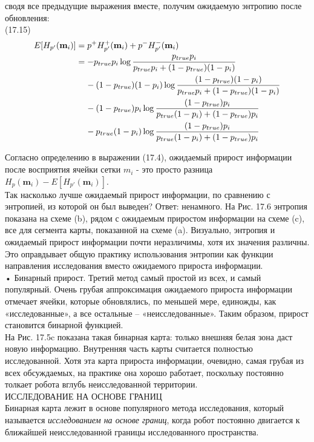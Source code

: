 \documentclass[10pt,a4paper]{article}
\begin{document}
сводя все предыдущие выражения вместе, получим ожидаемую энтропию после обновления:\\

(17.15)
\begin{equation*}
\begin{split}
E[H_{p'}(\textbf{m}_i)]&=p^+H_{p'}^+(\textbf{m}_i)+p^-H_{p'}^-(\textbf{m}_i)\\
&=-p_{true}p_i\log\frac{p_{true}p_i}{p_{true}p_i+(1-p_{true})(1-p_i)}\\
&\hspace{4mm}-(1-p_{true})(1-p_i)\log\frac{(1-p_{true})(1-p_i)}{p_{true}p_i+(1-p_{true})(1-p_i)}\\
&\hspace{4mm}-(1-p_{true})p_i\log\frac{(1-p_{true})p_i}{p_{true}(1-p_i)+(1-p_{true})p_i}\\
&\hspace{4mm}-p_{true}(1-p_i)\log\frac{(1-p_{true})p_i}{p_{true}(1-p_i)+(1-p_{true})p_i}
\end{split}
\end{equation*}

Согласно определению в выражении (17.4), ожидаемый прирост информации после восприятия ячейки сетки $m_i$ - это просто разница $H_p(\textbf{m}_i)-E[H_{p'}(\textbf{m}_i)]$.\\

Так насколько лучше ожидаемый прирост информации, по сравнению с энтропией, из которой он был выведен? Ответ: ненамного. На Рис. 17.6 энтропия показана на схеме (b), рядом с ожидаемым приростом информации на схеме (c), все для сегмента карты, показанной на схеме (a). Визуально, энтропия и ожидаемый прирост информации почти неразличимы, хотя их значения различны. Это оправдывает общую практику использования энтропии как функции направления исследования вместо ожидаемого прироста информации.\\

•	Бинарный прирост. Третий метод самый простой из всех, и самый популярный. Очень грубая аппроксимация ожидаемого прироста информации отмечает ячейки, которые обновлялись, по меньшей мере, единожды, как «исследованные», а все остальные – «неисследованные». Таким образом, прирост становится бинарной функцией.\\

На Рис. 17.5c показана такая бинарная карта: только внешняя белая зона даст новую информацию. Внутренняя часть карты считается полностью исследованной. Хотя эта карта прироста информации, очевидно, самая грубая из всех обсуждаемых, на практике она хорошо работает, поскольку постоянно толкает робота вглубь неисследованной территории.\\
ИССЛЕДОВАНИЕ НА ОСНОВЕ ГРАНИЦ\\
Бинарная карта лежит в основе популярного метода исследования, который называется \textit{исследованием на основе границ},
когда робот постоянно двигается к ближайшей неисследованной границы исследованного пространства.\\
\end{document}
